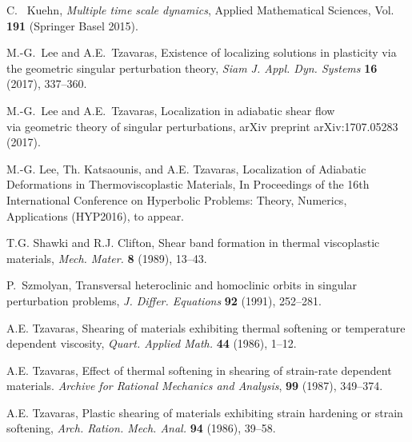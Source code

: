 \documentclass[a4paper,11pt]{article}
\theoremstyle{remark}
\begin{document}
\begin{thebibliography}{10}
{\sc C.~ Kuehn},
{\it Multiple time scale dynamics}, Applied Mathematical Sciences, Vol. {\bf 191} (Springer Basel 2015).

{\sc M.-G.~Lee and A.E.~Tzavaras},
Existence of localizing solutions in plasticity via the geometric singular perturbation theory,
{\it Siam J. Appl. Dyn. Systems} {\bf 16} (2017), 337--360.

{\sc M.-G.~Lee and A.E.~Tzavaras},
Localization in adiabatic shear flow \\via geometric theory of singular perturbations,
arXiv preprint arXiv:1707.05283 (2017).

{\sc M.-G. Lee, Th. Katsaounis, and A.E. Tzavaras},
Localization of Adiabatic Deformations in Thermoviscoplastic Materials, In Proceedings of the 16th International Conference on Hyperbolic Problems: Theory, Numerics, Applications (HYP2016), to appear.

%
%
%

%
%

{\sc T.G. Shawki and R.J. Clifton},
Shear band formation in thermal viscoplastic materials,
{\it Mech. Mater.}
{\bf 8 } (1989), 13--43.

{\sc P.~Szmolyan},
Transversal heteroclinic and homoclinic orbits in singular perturbation problems,
{\it J. Differ. Equations}
{\bf 92} (1991), 252--281.

{\sc A.E. Tzavaras},
Shearing of materials exhibiting thermal softening or temperature dependent viscosity,
{\em Quart.  Applied Math.} {\bf 44} (1986), 1--12.

{\sc A.E. Tzavaras},
Effect of thermal softening in shearing of strain-rate dependent materials.
{\em Archive for Rational Mechanics and Analysis}, {\bf 99} (1987), 349--374.

{\sc A.E. Tzavaras},
Plastic shearing of materials exhibiting strain hardening or strain softening,
{\it Arch. Ration. Mech. Anal.}
{\bf 94} (1986), 39--58.


\end{thebibliography}
\end{document}
